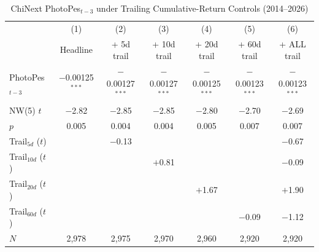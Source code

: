 \documentclass[AER]{AEA}
\begin{document}
\begin{table}[h!]
    \centering
    \caption{ChiNext PhotoPes$_{t-3}$ under Trailing Cumulative-Return Controls (2014--2026)}
    \label{tab:trailing_momentum}
    \setlength{\tabcolsep}{4pt}
    \footnotesize
    \begin{tabular}{lcccccc}
    \toprule
    & (1) & (2) & (3) & (4) & (5) & (6) \\
    & Headline & + 5d trail & + 10d trail & + 20d trail & + 60d trail & + ALL trail \\
    \midrule
    PhotoPes$_{t-3}$       & $-$0.00125$^{***}$ & $-$0.00127$^{***}$ & $-$0.00127$^{***}$ & $-$0.00125$^{***}$ & $-$0.00123$^{***}$ & $-$0.00123$^{***}$ \\
    NW(5) $t$              & $-$2.82           & $-$2.85           & $-$2.85           & $-$2.80           & $-$2.70           & $-$2.69           \\
    $p$                    & 0.005             & 0.004             & 0.004             & 0.005             & 0.007             & 0.007             \\
    \midrule
    Trail$_{5d}$ ($t$)     &                   & $-$0.13            &                   &                   &                   & $-$0.67            \\
    Trail$_{10d}$ ($t$)    &                   &                   & $+$0.81            &                   &                   & $-$0.09            \\
    Trail$_{20d}$ ($t$)    &                   &                   &                   & $+$1.67            &                   & $+$1.90            \\
    Trail$_{60d}$ ($t$)    &                   &                   &                   &                   & $-$0.09            & $-$1.12            \\
    \midrule
    $N$                    & 2{,}978           & 2{,}975           & 2{,}970           & 2{,}960           & 2{,}920           & 2{,}920           \\
    \bottomrule
    \end{tabular}
    \vspace{0.2cm}
    \footnotesize

\end{table}
\end{document}
